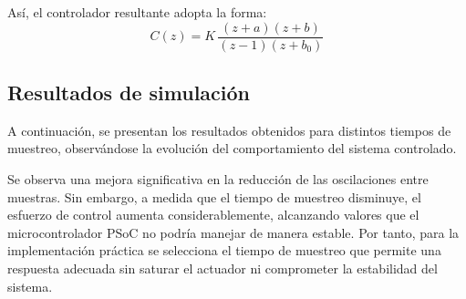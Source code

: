 Así, el controlador resultante adopta la forma:
\[
C(z) = K\,\frac{(z+a)(z+b)}{(z-1)(z+b_0)}
\]

\subsection*{Resultados de simulación}

A continuación, se presentan los resultados obtenidos para distintos tiempos de muestreo, observándose la evolución del comportamiento del sistema controlado.







\vspace{0.5em}
Se observa una mejora significativa en la reducción de las oscilaciones entre muestras. Sin embargo, a medida que el tiempo de muestreo disminuye, el esfuerzo de control aumenta considerablemente, alcanzando valores que el microcontrolador PSoC no podría manejar de manera estable. Por tanto, para la implementación práctica se selecciona el tiempo de muestreo que permite una respuesta adecuada sin saturar el actuador ni comprometer la estabilidad del sistema.

